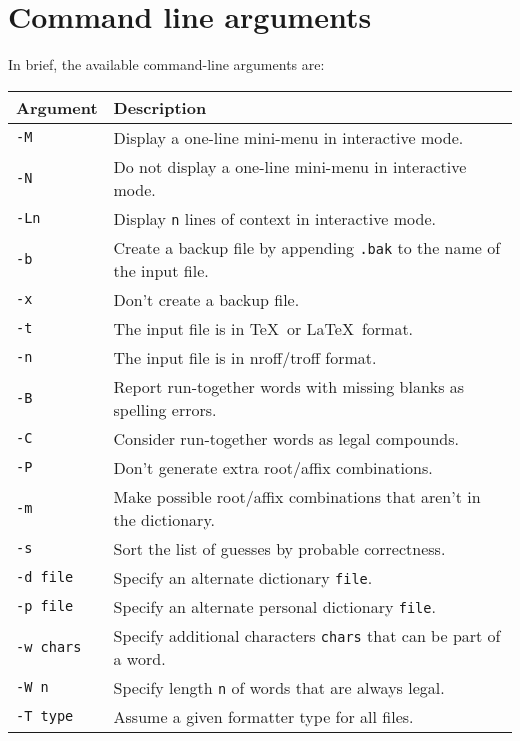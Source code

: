 \documentclass[twoside,11pt]{article}
\newenvironment{latexonly}{}{}
\begin{document}
\section{Command line arguments}

In brief, the available command-line arguments are:

\begin{latexonly}
\begin{tabular}{ll}
Argument & Description \\ \hline
{\tt -M       } & Display a one-line mini-menu in interactive mode.\\
{\tt -N       } & Do not display a one-line mini-menu in interactive mode.\\
{\tt -Ln      } & Display \verb+n+ lines of context in interactive mode.\\

{\tt -b       } & Create a backup file by appending \verb+.bak+ to the name of
                  the input file.\\
{\tt -x       } & Don't create a backup file.\\

{\tt -t       } & The input file is in \TeX\ or \LaTeX\ format.\\
{\tt -n       } & The input file is in nroff/troff format.\\

{\tt -B       } & Report run-together words with missing blanks as spelling
                  errors.\\
{\tt -C       } & Consider run-together words as legal compounds.\\

{\tt -P       } & Don't generate extra root/affix combinations.\\
{\tt -m       } & Make possible root/affix combinations that aren't in the
                  dictionary.\\

{\tt -s       } & Sort the list of guesses by probable correctness.\\
{\tt -d file  } & Specify an alternate dictionary \verb+file+\@.\\
{\tt -p file  } & Specify an alternate personal dictionary \verb+file+\@.\\
{\tt -w chars } & Specify additional characters \verb+chars+ that can be part
                  of a word.\\
{\tt -W n     } & Specify length \verb+n+ of words that are always legal.\\
{\tt -T type  } & Assume a given formatter type for all files.\\


\end{tabular}
\end{latexonly}
\end{document}
